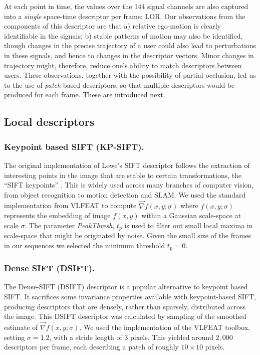 At each point in time, the values over the 144 signal channels are also captured into a {\it single} space-time descriptor per frame: 
LOR.  Our observations from the components of this descriptor are that a) relative ego-motion is clearly identifiable in the signals; b) stable patterns of motion may also be identified, though changes in the precise trajectory of a user could also lead to perturbations in these signals, and hence to changes in the descriptor vectors. Minor changes in trajectory might, therefore, reduce one's ability to match descriptors between users.  These observations, together with the possibility of partial occlusion, led us to the use of {\em patch} based descriptors, so that multiple descriptors would be produced for each frame. These are introduced next.


\subsection{Local descriptors}
\label{sec:descriptors}

\subsubsection{Keypoint based SIFT (KP-SIFT).}

The original implementation of Lowe's SIFT descriptor follows the extraction of interesting points in the image that are stable to certain transformations, the ``SIFT keypoints'' \cite{Lowe2004}. This is widely used across many branches of computer vision, from object recognition to motion detection and SLAM. We used the standard implementation from VLFEAT \cite{Vedaldi2008} to compute $\vec{\nabla}f(x,y;\sigma)$ where $f(x,y;\sigma)$ represents the embedding of image $f(x,y)$ within a Gaussian scale-space at scale $\sigma$. The parameter \emph{PeakThresh}, $t_p$ is used to filter out small local maxima in scale-space that might be originated by noise. Given the small size of the frames in our sequences we selected the minimum threshold $t_p = 0$.

\subsubsection{Dense SIFT (DSIFT).}

The Dense-SIFT (DSIFT) descriptor \citep{Lazebnik2006} is a popular  alternative to keypoint based SIFT. It sacrifices some invariance properties available with keypoint-based SIFT, producing descriptors that are densely, rather than sparsely, distributed across the image. This DSIFT descriptor was calculated by  sampling of the smoothed estimate of $\vec{\nabla}f(x,y;\sigma)$.  We used the implementation of the VLFEAT toolbox, setting $\sigma = 1.2$, with a stride length of 3 pixels. This  yielded around $2,000$ descriptors per frame, each describing a patch of roughly $10 \times 10$ pixels.  \\

